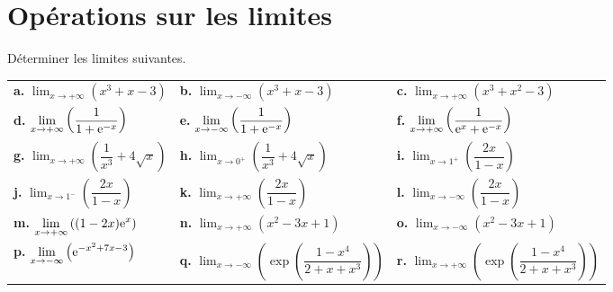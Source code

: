 \documentclass[11pt,fleqn, openany]{book} %
\begin{document}

\section*{Opérations sur les limites}

\begin{exercise}[topic=lim22]Déterminer les limites suivantes.

\renewcommand{\arraystretch}{2}
\begin{tabularx}{\linewidth}{XXX}

\textbf{a.} $\displaystyle \lim_{x \to +\infty}(x^3+x-3)$ &\textbf{b.} $\displaystyle \lim_{x \to -\infty}(x^3+x-3)$ & \textbf{c.} $\displaystyle \lim_{x \to +\infty}(x^3+x^2-3)$ \\
\textbf{d.} $\displaystyle \lim_{x \to +\infty}\left(\dfrac{1}{1+\mathrm{e}^{-x}}\right)$ &\textbf{e.} $\displaystyle \lim_{x \to -\infty}\left(\dfrac{1}{1+\mathrm{e}^{-x}}\right)$ &\textbf{f.} $\displaystyle \lim_{x \to +\infty}\left(\dfrac{1}{\mathrm{e}^x+\mathrm{e}^{-x}}\right)$ \\
\textbf{g.} $\displaystyle \lim_{x \to +\infty}\left(\dfrac{1}{x^3}+4\sqrt{x}\right)$ &\textbf{h.} $\displaystyle \lim_{x \to 0^+}\left(\dfrac{1}{x^3}+4\sqrt{x}\right)$ &\textbf{i.} $\displaystyle \lim_{x \to 1^+}\left( \dfrac{2x}{1-x}\right)$ \\
\textbf{j.} $\displaystyle \lim_{x \to 1^-}\left( \dfrac{2x}{1-x}\right)$ &\textbf{k.} $\displaystyle \lim_{x \to +\infty}\left( \dfrac{2x}{1-x}\right)$ & \textbf{l.} $\displaystyle \lim_{x \to -\infty}\left( \dfrac{2x}{1-x}\right)$ \\
\textbf{m.} $\displaystyle \lim_{x \to +\infty}\left( (1-2x)\mathrm{e}^x\right)$ &\textbf{n.} $\displaystyle \lim_{x \to +\infty}\left( x^2-3x+1\right)$ &\textbf{o.} $\displaystyle \lim_{x \to -\infty}\left( x^2-3x+1\right)$\\
\textbf{p.} $\displaystyle \lim_{x \to -\infty}\left( \mathrm{e}^{-x^2+7x-3}\right)$ &\textbf{q.} $\displaystyle \lim_{x \to -\infty}\left( \exp\left( \dfrac{1-x^4}{2+x+x^3}\right)\right)$  &\textbf{r.} $\displaystyle \lim_{x \to +\infty}\left( \exp\left( \dfrac{1-x^4}{2+x+x^3}\right)\right)$\end{tabularx}

\end{exercise}
\end{document}
